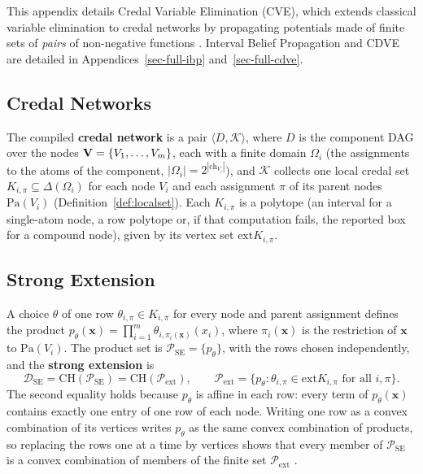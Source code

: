 \documentclass{article} %
\DeclareRobustCommand{\rev}[1]{{\color{blue}#1}}
\newcommand{\DSE}{\mathcal{D}_{\mathrm{SE}}}
\newcommand{\ch}{\mathrm{ch}}
\newcommand{\ext}{\mathrm{ext}}
\providecommand{\Pa}{\mathrm{Pa}}
\begin{document}
This appendix details Credal Variable Elimination (CVE), which extends classical variable elimination \rev{\citep{zhang-poole96,dechter-bucket}} to credal networks by propagating potentials made of finite sets of \emph{pairs} of non-negative functions \citep{maua2012ijar,maua2020ijar}. Interval Belief Propagation and CDVE are detailed in Appendices~\ref{sec-full-ibp} and~\ref{sec-full-cdve}.


\subsection{Credal Networks}

The compiled \textbf{credal network} is a pair $\langle D, \mathcal{K} \rangle$, where $D$ is the
component DAG over the nodes $\mathbf{V} = \{V_1, \dots, V_m\}$, each with a finite domain $\Omega_i$
(the assignments to the atoms of the component, $|\Omega_i|=2^{|\ch_{V_i}|}$), and $\mathcal{K}$
collects one local credal set $K_{i,\pi}\subseteq\Delta(\Omega_i)$ for each node $V_i$ and each
assignment $\pi$ of its parent nodes $\Pa(V_i)$ (Definition~\ref{def:localset}). Each $K_{i,\pi}$
is a polytope (an interval for a single-atom node, a row polytope or, if that computation
fails, the reported box for a compound node), given by its vertex set $\ext K_{i,\pi}$.

\subsection{Strong Extension}

A choice $\theta$ of one row $\theta_{i,\pi}\in K_{i,\pi}$ for every node and parent
assignment defines the product $p_\theta(\mathbf x)=\prod_{i=1}^{m}\theta_{i,\pi_i(\mathbf
x)}(x_i)$, where $\pi_i(\mathbf x)$ is the restriction of $\mathbf x$ to $\Pa(V_i)$. The
product set is $\mathcal P_{\mathrm{SE}}=\{p_\theta\}$, with the rows chosen independently,
and the \textbf{strong extension} is
\begin{equation}\label{eq:strong-ext}
  \DSE = \mathrm{CH}(\mathcal P_{\mathrm{SE}}) = \mathrm{CH}(\mathcal P_{\mathrm{ext}}),\qquad
  \mathcal P_{\mathrm{ext}}=\{p_\theta : \theta_{i,\pi}\in \ext K_{i,\pi}\text{ for all }i,\pi\}.
\end{equation}
The second equality holds because $p_\theta$ is affine in each row: every term of
$p_\theta(\mathbf x)$ contains exactly one entry of one row of each node. Writing one row as
a convex combination of its vertices writes $p_\theta$ as the same convex combination of
products, so replacing the rows one at a time by vertices shows that every member of
$\mathcal P_{\mathrm{SE}}$ is a convex combination of members of the finite set
$\mathcal P_{\mathrm{ext}}$ \citep{maua2020ijar}.
\end{document}
